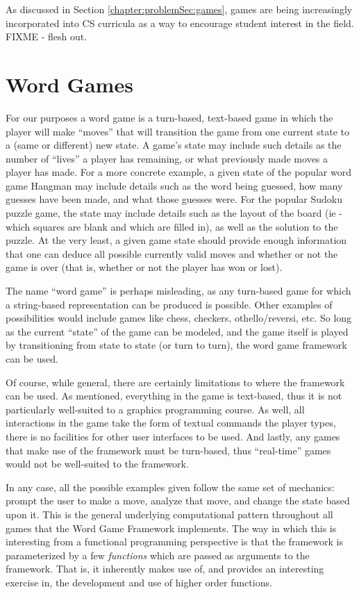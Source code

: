 As discussed in Section \ref{chapter:problemSec:games}, games are being increasingly incorporated into CS curricula as a way to encourage student interest in the field.  FIXME - flesh out.

\section{Word Games}
\label{wordGameDefn}

For our purposes a word game is a turn-based, text-based game in which the player will make ``moves'' that will transition the game from one current state to a (same or different) new state.  A game's state may include such details as the number of ``lives'' a player has remaining, or what previously made moves a player has made.  For a more concrete example, a given state of the popular word game Hangman may include details such as the word being guessed, how many guesses have been made, and what those guesses were.  For the popular Sudoku puzzle game, the state may include details such as the layout of the board (ie - which squares are blank and which are filled in), as well as the solution to the puzzle.  At the very least, a given game state should provide enough information that one can deduce all possible currently valid moves and whether or not the game is over (that is, whether or not the player has won or lost).

The name ``word game'' is perhaps misleading, as any turn-based game for which a string-based representation can be produced is possible.  Other examples of possibilities would include games like chess, checkers, othello/reversi, etc.  So long as the current ``state'' of the game can be modeled, and the game itself is played by transitioning from state to state (or turn to turn), the word game framework can be used.

Of course, while general, there are certainly limitations to where the framework can be used.  As mentioned, everything in the game is text-based, thus it is not particularly well-suited to a graphics programming course.  As well, all interactions in the game take the form of textual commands the player types, there is no facilities for other user interfaces to be used.  And lastly, any games that make use of the framework must be turn-based, thus ``real-time'' games would not be well-suited to the framework.

In any case, all the possible examples given follow the same set of mechanics: prompt the user to make a move, analyze that move, and change the state based upon it.  This is the general underlying computational pattern throughout all games that the Word Game Framework implements.  The way in which this is interesting from a functional programming perspective is that the framework is parameterized by a few \emph{functions} which are passed as arguments to the framework.  That is, it inherently makes use of, and provides an interesting exercise in, the development and use of higher order functions.

